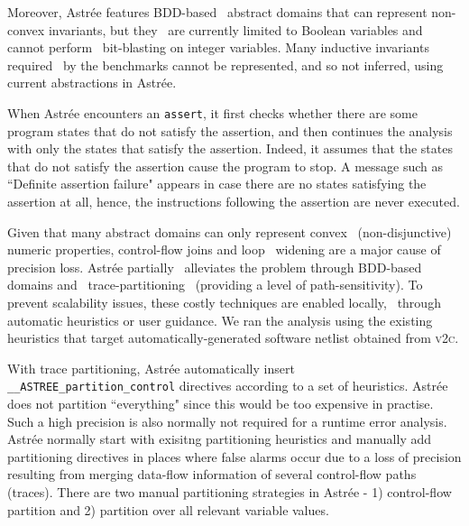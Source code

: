 Moreover, Astr{\'e}e features BDD-based  
abstract domains that can represent non-convex invariants, but they  
are currently limited to Boolean variables and cannot perform  
bit-blasting on integer variables.  Many inductive invariants required  
by the benchmarks cannot be represented, and so not inferred, using 
current abstractions in Astr{\'e}e.

When Astr{\'e}e encounters an \texttt{assert}, it first checks whether 
there are some program states that do not satisfy the assertion, and 
then continues the analysis with only the states that satisfy the assertion. 
Indeed, it assumes that the states that do not satisfy the assertion cause 
the program to stop.  A message such as ``Definite assertion failure" appears 
in case there are no states satisfying the assertion at all, hence, the 
instructions following the assertion are never executed.


%
%
Given that many abstract domains can only represent convex  
(non-disjunctive) numeric properties, control-flow joins and loop  
widening are a major cause of precision loss.  Astr{\'e}e partially  
alleviates the problem through BDD-based domains and 
trace-partitioning~\cite{DBLP:journals/toplas/RivalM07}
(providing a level of path-sensitivity). 
To prevent scalability 
 issues, 
 these costly techniques are enabled locally, 
 through automatic heuristics 
or user guidance. We ran the analysis using the existing heuristics that 
target automatically-generated software netlist obtained from \textsc{v2c}. 


With trace partitioning, Astr{\'e}e automatically insert 
\texttt{\_\_ASTREE\_partition\_control} directives according to a set of 
heuristics.  Astr{\'e}e does not partition ``everything" since this would 
be too expensive in practise. Such a high precision is also normally not 
required for a runtime error analysis. Astr{\'e}e normally start with exisitng 
partitioning heuristics and manually add partitioning directives in places 
where false alarms occur due to a loss of precision resulting from merging 
data-flow information of several control-flow paths (traces).
There are two manual partitioning strategies in Astr{\'e}e - 
1) control-flow partition and 2) partition over all relevant variable values.



